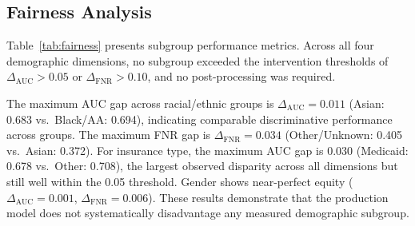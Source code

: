 \documentclass[11pt,letterpaper]{article}
\begin{document}
\subsection{Fairness Analysis}

Table~\ref{tab:fairness} presents subgroup performance metrics. Across all four demographic dimensions, no subgroup exceeded the intervention thresholds of $\Delta_{\text{AUC}} > 0.05$ or $\Delta_{\text{FNR}} > 0.10$, and no post-processing was required.

The maximum AUC gap across racial/ethnic groups is $\Delta_{\text{AUC}} = 0.011$ (Asian: 0.683 vs.\ Black/AA: 0.694), indicating comparable discriminative performance across groups. The maximum FNR gap is $\Delta_{\text{FNR}} = 0.034$ (Other/Unknown: 0.405 vs.\ Asian: 0.372). For insurance type, the maximum AUC gap is 0.030 (Medicaid: 0.678 vs.\ Other: 0.708), the largest observed disparity across all dimensions but still well within the 0.05 threshold. Gender shows near-perfect equity ($\Delta_{\text{AUC}} = 0.001$, $\Delta_{\text{FNR}} = 0.006$). These results demonstrate that the production model does not systematically disadvantage any measured demographic subgroup.
\end{document}
